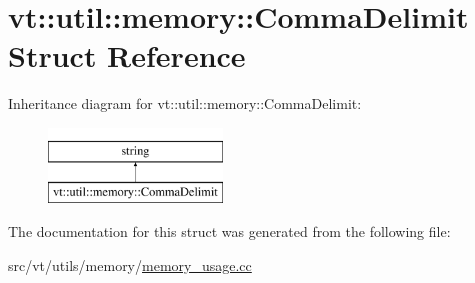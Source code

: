\hypertarget{structvt_1_1util_1_1memory_1_1_comma_delimit}{}\section{vt\+:\+:util\+:\+:memory\+:\+:Comma\+Delimit Struct Reference}
\label{structvt_1_1util_1_1memory_1_1_comma_delimit}
Inheritance diagram for vt\+:\+:util\+:\+:memory\+:\+:Comma\+Delimit\+:\begin{figure}[H]
\begin{center}
\leavevmode
\includegraphics[height=2.000000cm]{structvt_1_1util_1_1memory_1_1_comma_delimit}
\end{center}
\end{figure}


The documentation for this struct was generated from the following file\+:\begin{DoxyCompactItemize}
\item 
src/vt/utils/memory/\hyperlink{memory__usage_8cc}{memory\+\_\+usage.\+cc}\end{DoxyCompactItemize}
